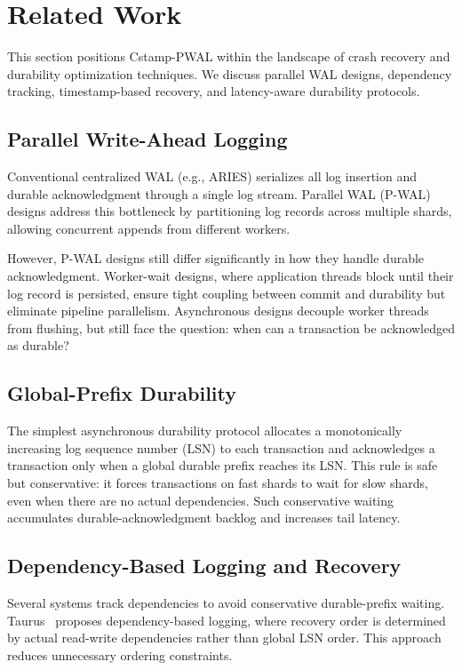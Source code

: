 \section{Related Work}
\label{sec:related}

This section positions Cstamp-PWAL within the landscape of crash recovery and
durability optimization techniques.  We discuss parallel WAL designs, dependency
tracking, timestamp-based recovery, and latency-aware durability protocols.

\subsection{Parallel Write-Ahead Logging}

Conventional centralized WAL (e.g., ARIES) serializes all log insertion and
durable acknowledgment through a single log stream.  Parallel WAL (P-WAL) designs
address this bottleneck by partitioning log records across multiple shards,
allowing concurrent appends from different workers.

However, P-WAL designs still differ significantly in how they handle durable
acknowledgment.  Worker-wait designs, where application threads block until their
log record is persisted, ensure tight coupling between commit and durability but
eliminate pipeline parallelism.  Asynchronous designs decouple worker threads
from flushing, but still face the question: when can a transaction be
acknowledged as durable?

\subsection{Global-Prefix Durability}

The simplest asynchronous durability protocol allocates a monotonically
increasing log sequence number (LSN) to each transaction and acknowledges a
transaction only when a global durable prefix reaches its LSN.  This rule is
safe but conservative: it forces transactions on fast shards to wait for slow
shards, even when there are no actual dependencies.  Such conservative waiting
accumulates durable-acknowledgment backlog and increases tail latency.

\subsection{Dependency-Based Logging and Recovery}

Several systems track dependencies to avoid conservative durable-prefix waiting.
Taurus~\cite{Taurus} proposes dependency-based logging, where recovery order is
determined by actual read-write dependencies rather than global LSN order.  This
approach reduces unnecessary ordering constraints.

